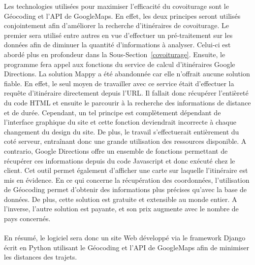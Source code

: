 \documentclass[12pt, a4paper, oneside]{article}
\begin{document}
    \indent Les technologies utilisées pour maximiser l'efficacité du covoiturage sont le Géocoding et l'API de GoogleMaps. En effet, les deux principes seront utilisés conjointement afin d'améliorer la recherche d'itinéraires de covoiturage. Le premier sera utilisé entre autres en vue d'effectuer un pré-traitement sur les données afin de diminuer la quantité d'informations à analyser. Celui-ci est abordé plus en profondeur dans la Sous-Section~\ref{covoiturage}. Ensuite, le programme fera appel aux fonctions du service de calcul d'itinéraires Google Directions. La solution Mappy a été abandonnée car elle n'offrait aucune solution fiable. En effet, le seul moyen de travailler avec ce service était d'effectuer la requête d'itinéraire directement depuis l'URL. Il fallait donc récupérer l'entièreté du code HTML et ensuite le parcourir à la recherche des informations de distance et de durée. Cependant, un tel principe est complètement dépendant de l'interface graphique du site et cette fonction deviendrait incorrecte à chaque changement du design du site. De plus, le travail s'effectuerait entièrement du coté serveur, entraînant donc une grande utilisation des ressources disponible. A contrario, Google Directions offre un ensemble de fonctions permettant de récupérer ces informations depuis du code Javascript et donc exécuté chez le client. Cet outil permet également d'afficher une carte sur laquelle l'itinéraire est mis en évidence. En ce qui concerne la récupération des coordonnées, l'utilisation de Géocoding permet d'obtenir des informations plus précises qu'avec la base de données. De plus, cette solution est gratuite et extensible au monde entier. A l'inverse, l'autre solution est payante, et son prix augmente avec le nombre de pays concernés.\\\\
    \indent En résumé, le logiciel sera donc un site Web développé via le framework Django écrit en Python utilisant le Géocoding et l'API de GoogleMaps afin de minimiser les distances des trajets.
\end{document}
